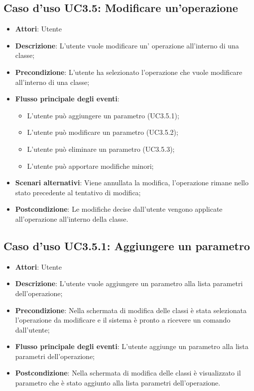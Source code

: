 \documentclass[../AnalisiDeiRequisiti.tex]{subfiles}
\begin{document}
		\subsection{Caso d'uso UC3.5: Modificare un'operazione}
		\begin{itemize}
			\item \textbf{Attori}: Utente
			\item \textbf{Descrizione}: L'utente vuole modificare un' operazione all'interno di una classe;
			\item \textbf{Precondizione}: L'utente ha selezionato l'operazione che vuole modificare all'interno di una classe;
			\item \textbf{Flusso principale degli eventi}: \begin{itemize}
				\item L'utente può aggiungere un parametro (UC3.5.1);
				\item L'utente può modificare un parametro (UC3.5.2);
				\item L'utente può eliminare un parametro (UC3.5.3);
				\item L'utente può apportare modifiche minori;
			\end{itemize}
			\item \textbf{Scenari alternativi}: Viene annullata la modifica, l'operazione rimane nello stato precedente al tentativo di modifica;
			\item \textbf{Postcondizione}: Le modifiche decise dall'utente vengono applicate all'operazione all'interno della classe.
		\end{itemize}
		\subsection{Caso d'uso UC3.5.1: Aggiungere un parametro}
		\begin{itemize}
			\item \textbf{Attori}: Utente
			\item \textbf{Descrizione}: L'utente vuole aggiungere un parametro alla lista parametri dell'operazione;
			\item \textbf{Precondizione}: Nella schermata di modifica delle classi è stata selezionata l'operazione da modificare e il sistema è pronto a ricevere un comando dall'utente;
			\item \textbf{Flusso principale degli eventi}: L'utente aggiunge un parametro alla lista parametri dell'operazione;
			\item \textbf{Postcondizione}: Nella schermata di modifica delle classi è visualizzato il parametro che è stato aggiunto alla lista parametri dell'operazione.
		\end{itemize}
\end{document}
